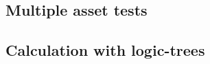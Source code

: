 \subsection{Multiple asset tests}
\label{subsec:acc-cr-multiple}


% 

\subsection{Calculation with logic-trees}
\label{subsec:acc-cr-lt}


